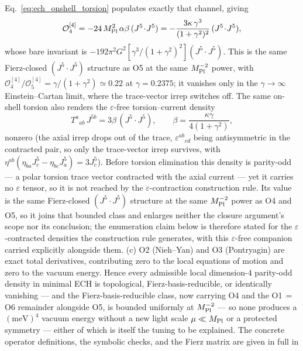 \documentclass[aps,prd,twocolumn,superscriptaddress,showpacs,preprintnumbers,nofootinbib,longbibliography,floatfix]{revtex4-2}
\newcommand{\MPl}{M_{\rm Pl}}
\begin{document}
Eq.~\eqref{eq:ech_onshell_torsion} populates exactly that channel, giving
\begin{equation}\label{eq:o4_onshell}
\mathcal{O}_4^{[4]}=-24\,\MPl^{2}\,\alpha\beta\,(J^5\!\cdot\!J^5)
=-\frac{3\kappa\,\gamma^{3}}{(1+\gamma^{2})^{2}}\,(J^5\!\cdot\!J^5),
\end{equation}
whose bare invariant is
$-192\pi^2G^2[\gamma^3/(1+\gamma^2)^2](J^5\!\cdot\!J^5)$. This is the same
Fierz-closed $(J^5\!\cdot\!J^5)$ structure as O5 at the same
$\MPl^{-2}$ power, with
$\mathcal{O}_4^{[4]}/\mathcal{O}_5^{[4]}=\gamma/(1+\gamma^2)\simeq0.22$
at $\gamma=0.2375$; it vanishes only in the $\gamma\to\infty$
Einstein--Cartan limit, where the trace-vector irrep switches off.
The same on-shell torsion also renders the $\varepsilon$-free
torsion--current density
\begin{equation}\label{eq:vj5_onshell}
T^{a}{}_{ab}\,J^{5b}=3\beta\,(J^5\!\cdot\!J^5),
\qquad
\beta=\frac{\kappa\gamma}{4(1+\gamma^{2})},
\end{equation}
nonzero (the axial irrep drops out of the trace, $\varepsilon^{ab}{}_{cd}$
being antisymmetric in the contracted pair, so only the trace-vector irrep
survives, with $\eta^{ab}(\eta_{ba}J^5_c-\eta_{bc}J^5_a)=3J^5_c$).
Before torsion elimination this density is parity-odd --- a polar torsion
trace vector contracted with the axial current --- yet it carries no
$\varepsilon$ tensor, so it is not reached by the
$\varepsilon$-contraction construction rule. Its
value is the same Fierz-closed $(J^5\!\cdot\!J^5)$ structure at the same
$\MPl^{-2}$ power as O4 and O5, so it joins that bounded class and
enlarges neither the closure argument's scope nor its conclusion; the
enumeration claim below is therefore stated for the
$\varepsilon$-contracted densities the construction rule generates,
with this $\varepsilon$-free companion carried explicitly alongside them.
(c) O2 (Nieh--Yan) and O3 (Pontryagin) are exact
total derivatives, contributing zero to the local equations of motion and zero
to the vacuum energy. Hence every admissible local dimension-$4$ parity-odd
density in minimal ECH is topological, Fierz-basis-reducible, or
identically vanishing --- and the Fierz-basis-reducible class, now
carrying O4 and the O1$\,=\,$O6 remainder alongside O5, is bounded
uniformly at $\MPl^{-2}$ --- so none produces a $(\text{meV})^4$ vacuum energy without a
new light scale $\mu\ll\MPl$ or a protected symmetry --- either of which is
itself the tuning to be explained. The concrete operator definitions, the
symbolic checks, and the Fierz matrix are given in full in
\end{document}
